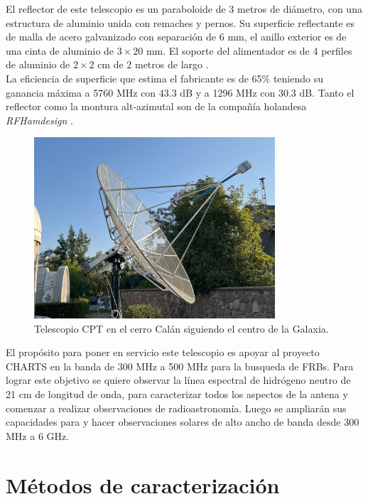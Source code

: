 El reflector de este telescopio es un paraboloide de 3 metros de diámetro, con una estructura de aluminio unida con remaches y pernos. Su superficie reflectante es de malla de acero galvanizado con separación de 6 mm, el anillo exterior es de una cinta de aluminio de $3\times 20$ mm. El soporte del alimentador es de 4 perfiles de aluminio de $2\times 2$ cm de 2 metros de largo \cite{rfhamdesign3meterdish}.\\

La eficiencia de superficie que estima el fabricante es de 65\% teniendo su ganancia máxima a 5760 MHz con 43.3 dB y a 1296 MHz con 30.3 dB. Tanto el reflector como la montura alt-azimutal son de la compañía holandesa \textit{RFHamdesign} \cite{rfhamdesign3meterdish}.\\

\begin{figure}
    \centering
    \includegraphics[width = 0.8\textwidth]{img/cpt_tracking}
    \caption{Telescopio CPT en el cerro Calán siguiendo el centro de la Galaxia.}
    \label{fig:cpt}
\end{figure}

El propósito para poner en servicio este telescopio es apoyar al proyecto CHARTS en la banda de 300 MHz a 500 MHz para la busqueda de FRBs. Para lograr este objetivo se quiere observar la línea espectral de hidrógeno neutro de 21 cm de longitud de onda, para caracterizar todos los aspectos de la antena y comenzar a realizar observaciones de radioastronomía. Luego se ampliarán sus capacidades para  y hacer observaciones solares de alto ancho de banda desde 300 MHz a 6 GHz.\\

\section{Métodos de caracterización}

